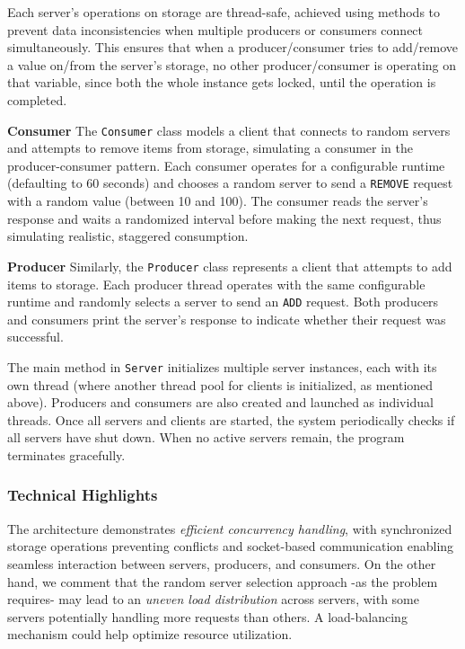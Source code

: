 \documentclass[acmlarge]{acmart}
\begin{document}
Each server’s operations on storage are thread-safe, achieved using \textbf{} methods to prevent data
inconsistencies when multiple producers or consumers connect simultaneously.
This ensures that when a producer/consumer tries to add/remove a value on/from the server's storage, no other
producer/consumer is operating on that variable, since both the whole  instance gets locked, until the
operation is completed.

\textbf{Consumer}
The \texttt{Consumer} class models a client that connects to random servers and attempts to remove items from storage, simulating a consumer in the producer-consumer pattern.
Each consumer operates for a configurable runtime (defaulting to 60 seconds) and chooses a random server to send a \texttt{REMOVE} request with a random value (between 10 and 100).
The consumer reads the server’s response and waits a randomized interval before making the next request, thus simulating realistic, staggered consumption.

\textbf{Producer}
Similarly, the \texttt{Producer} class represents a client that attempts to add items to storage.
Each producer thread operates with the same configurable runtime and randomly selects a server to send an \texttt{ADD} request.
Both producers and consumers print the server's response to indicate whether their request was successful.

The main method in \texttt{Server} initializes multiple server instances, each with its own thread (where another
thread pool for clients is initialized, as mentioned above).
Producers and consumers are also created and launched as individual threads.
Once all servers and clients are started, the system periodically checks if all servers have shut down.
When no active servers remain, the program terminates gracefully.

\subsubsection{Technical Highlights}
The architecture demonstrates \textit{efficient concurrency handling}, with synchronized storage operations preventing
conflicts and socket-based communication enabling seamless interaction between servers, producers, and consumers.
On the other hand, we comment that the random server selection approach -as the problem requires- may lead to an
\textit{uneven load distribution} across servers, with some servers potentially handling more requests than others.
A load-balancing mechanism could help optimize resource utilization.
\end{document}
